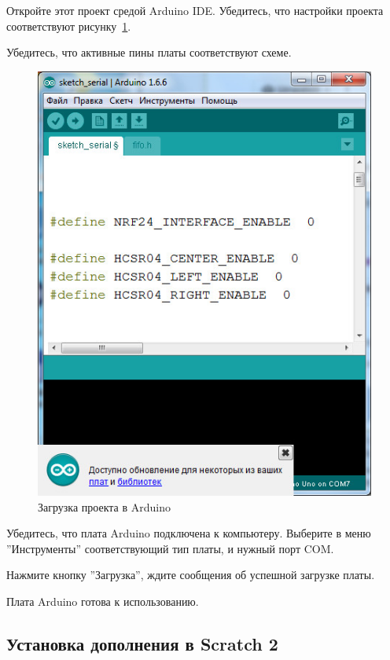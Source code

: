 Откройте этот проект средой Arduino IDE. Убедитесь, что настройки проекта соответствуют рисунку~\ref{p:arduino_programming}.

Убедитесь, что активные пины платы соответствуют схеме.

\begin{figure}[H]\center
  \captionsetup{singlelinecheck=true} %
  \includegraphics*[scale=0.7]{about/images/arduino_programming}
  \caption{Загрузка проекта в Arduino} \label{p:arduino_programming}
\end{figure}

Убедитесь, что плата Arduino подключена к компьютеру. Выберите в меню ''Инструменты'' соответствующий тип платы, и нужный порт COM.

Нажмите кнопку ''Загрузка'', ждите сообщения об успешной загрузке платы.

Плата Arduino готова к использованию.


\subsection{Установка дополнения в Scratch 2}

